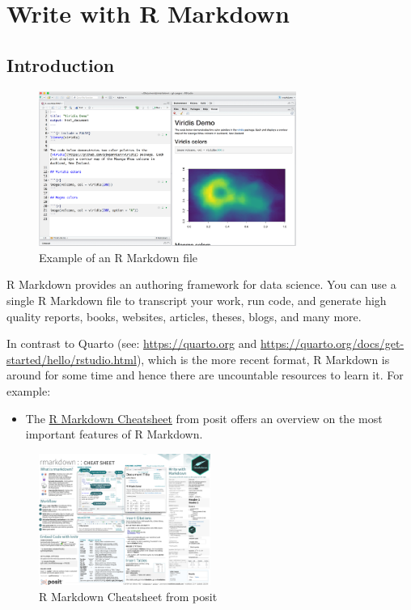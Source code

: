 \documentclass[
  12pt,
  oneside]{book}
\providecommand{\tightlist}{%
  \setlength{\itemsep}{0pt}\setlength{\parskip}{0pt}}
\begin{document}
\hypertarget{write-with-r-markdown}{%
\chapter{Write with R Markdown}\label{write-with-r-markdown}}

\hypertarget{introduction}{%
\section{Introduction}\label{introduction}}

\begin{figure}
\centering
\includegraphics[width=0.75\textwidth,height=\textheight]{fig/rmstudio.png}
\caption{\label{fig:examplermd} Example of an R Markdown file}
\end{figure}

R Markdown provides an authoring framework for data science. You can use a single
R Markdown file to transcript your work, run code, and generate high quality reports, books, websites, articles, theses, blogs, and many more.

In contrast to Quarto (see: \url{https://quarto.org} and \url{https://quarto.org/docs/get-started/hello/rstudio.html}), which is the more recent format, R Markdown is around for some time and hence there are uncountable resources to learn it. For example:

\begin{itemize}
\tightlist
\item
  The \href{https://raw.githubusercontent.com/rstudio/cheatsheets/main/rmarkdown.pdf}{R Markdown Cheatsheet} from posit offers an overview on the most important features of R Markdown.
\end{itemize}

\begin{figure}
\centering
\includegraphics[width=0.5\textwidth,height=\textheight]{fig/rmdcheat.png}
\caption{\label{fig:rmdcheat} R Markdown Cheatsheet from posit}
\end{figure}
\end{document}
